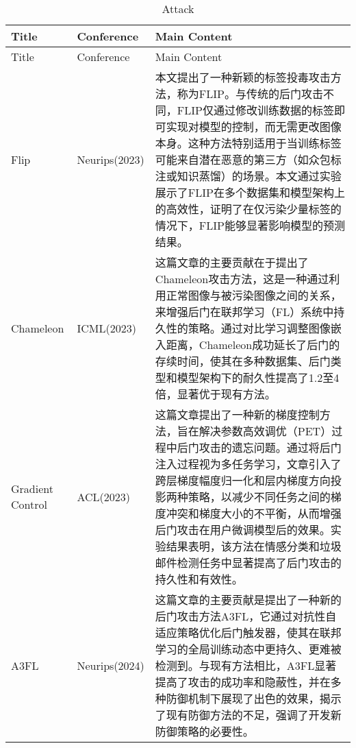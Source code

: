 \documentclass[lettersize,journal]{IEEEtran}
\begin{document}


\onecolumn
\begin{longtable}{|p{3.5cm}|p{2cm}|p{10.5cm}|} 
    \caption{Attack}
    \label{tabl:attack} \\ \hline
    Title & Conference & Main Content \\ \hline
    \endfirsthead \hline
    Title & Conference & Main Content \\ \hline 
    \endhead \hline
   Flip\cite{jha2023label} & Neurips(2023) &  本文提出了一种新颖的标签投毒攻击方法，称为FLIP。与传统的后门攻击不同，FLIP仅通过修改训练数据的标签即可实现对模型的控制，而无需更改图像本身。这种方法特别适用于当训练标签可能来自潜在恶意的第三方（如众包标注或知识蒸馏）的场景。本文通过实验展示了FLIP在多个数据集和模型架构上的高效性，证明了在仅污染少量标签的情况下，FLIP能够显著影响模型的预测结果。 \\ \hline
   Chameleon\cite{dai2023chameleon} & ICML(2023) & 这篇文章的主要贡献在于提出了Chameleon攻击方法，这是一种通过利用正常图像与被污染图像之间的关系，来增强后门在联邦学习（FL）系统中持久性的策略。通过对比学习调整图像嵌入距离，Chameleon成功延长了后门的存续时间，使其在多种数据集、后门类型和模型架构下的耐久性提高了1.2至4倍，显著优于现有方法。 \\ \hline
   Gradient Control\cite{gu2023gradient} & ACL(2023) & 这篇文章提出了一种新的梯度控制方法，旨在解决参数高效调优（PET）过程中后门攻击的遗忘问题。通过将后门注入过程视为多任务学习，文章引入了跨层梯度幅度归一化和层内梯度方向投影两种策略，以减少不同任务之间的梯度冲突和梯度大小的不平衡，从而增强后门攻击在用户微调模型后的效果。实验结果表明，该方法在情感分类和垃圾邮件检测任务中显著提高了后门攻击的持久性和有效性。 \\ \hline
   A3FL\cite{zhang2024a3fl} & Neurips(2024) & 这篇文章的主要贡献是提出了一种新的后门攻击方法A3FL，它通过对抗性自适应策略优化后门触发器，使其在联邦学习的全局训练动态中更持久、更难被检测到。与现有方法相比，A3FL显著提高了攻击的成功率和隐蔽性，并在多种防御机制下展现了出色的效果，揭示了现有防御方法的不足，强调了开发新防御策略的必要性。\\ \hline

\end{longtable}
\end{document}

